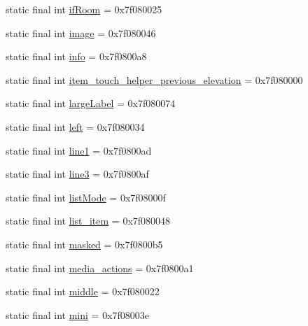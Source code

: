 \begin{CompactItemize}
\item 
static final int \hyperlink{classandroid_1_1support_1_1transition_1_1_r_1_1id_044c00074bc502a7235c3238566fc3f4}{ifRoom} = 0x7f080025
\item 
static final int \hyperlink{classandroid_1_1support_1_1transition_1_1_r_1_1id_9bd0f0c59fb307b4ec49c9c3cf51612d}{image} = 0x7f080046
\item 
static final int \hyperlink{classandroid_1_1support_1_1transition_1_1_r_1_1id_872cd7531fa662414849de66d579e2f9}{info} = 0x7f0800a8
\item 
static final int \hyperlink{classandroid_1_1support_1_1transition_1_1_r_1_1id_36b72b1d58140c3551a3eb32e51c3aeb}{item\_\-touch\_\-helper\_\-previous\_\-elevation} = 0x7f080000
\item 
static final int \hyperlink{classandroid_1_1support_1_1transition_1_1_r_1_1id_9931a9b12c8b87661ef8b95eeb7258eb}{largeLabel} = 0x7f080074
\item 
static final int \hyperlink{classandroid_1_1support_1_1transition_1_1_r_1_1id_601dfbf7311f087fcb7c0734c1b4b036}{left} = 0x7f080034
\item 
static final int \hyperlink{classandroid_1_1support_1_1transition_1_1_r_1_1id_0383170c85b9fab2fd0ce5145f242466}{line1} = 0x7f0800ad
\item 
static final int \hyperlink{classandroid_1_1support_1_1transition_1_1_r_1_1id_a536736c6be748da68a47fe62743f322}{line3} = 0x7f0800af
\item 
static final int \hyperlink{classandroid_1_1support_1_1transition_1_1_r_1_1id_16dde8817ffba1e14ab28422c02e74cf}{listMode} = 0x7f08000f
\item 
static final int \hyperlink{classandroid_1_1support_1_1transition_1_1_r_1_1id_a0e646ca4a4a5d81a1227891918cdea5}{list\_\-item} = 0x7f080048
\item 
static final int \hyperlink{classandroid_1_1support_1_1transition_1_1_r_1_1id_3f4203b6ec66ce46aa7f9a334a3d5a5a}{masked} = 0x7f0800b5
\item 
static final int \hyperlink{classandroid_1_1support_1_1transition_1_1_r_1_1id_6bc9289d529c7058b23bc706f1ebade2}{media\_\-actions} = 0x7f0800a1
\item 
static final int \hyperlink{classandroid_1_1support_1_1transition_1_1_r_1_1id_85ff23ea0320a8fad5e8ea664552f825}{middle} = 0x7f080022
\item 
static final int \hyperlink{classandroid_1_1support_1_1transition_1_1_r_1_1id_dd7b8c5a603667fb98d66d2b69fcc5c6}{mini} = 0x7f08003e
\item 

\end{CompactItemize}

